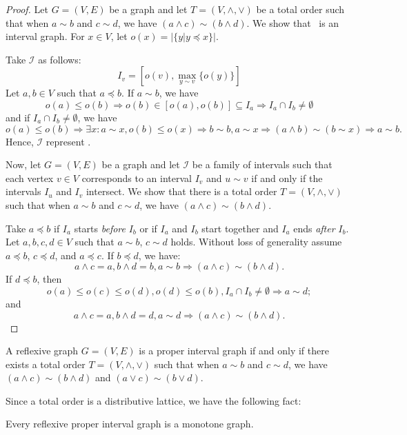 \begin{proof}
Let \(G=(V,E)\) be a graph and let \(T=(V,\wedge,\vee)\) be a total order such that
when \(a\sim b\) and \(c \sim d\), we have \((a \wedge c) \sim (b \wedge d)\)\@.
We show that \mG\ is an interval graph. For \(x\in V\), let \(o(x) = |\{y| y\preceq x\}|\)\@.

Take \(\mathcal{I}\) as follows:
\[I_v = [o(v), \max_{y\sim v}\{o(y)\}]\]
Let \(a, b\in V\) such that \(a \preceq b\)\@. If \(a\sim b\), we have
\[o(a) \le o(b) \Rightarrow o(b) \in [o(a), o(b)] \subseteq I_a \Rightarrow I_a \cap I_b \neq \emptyset\]
and if \(I_a \cap I_b \neq \emptyset\), we have
\[o(a) \le o(b) \Rightarrow \exists x: a \sim x, o(b) \le o(x) \Rightarrow b\sim b, a\sim x \Rightarrow (a \wedge b) \sim (b \sim x) \Rightarrow a \sim b.\]
Hence, \(\mathcal{I}\) represent \mG\@.

Now, let \(G=(V,E)\) be a graph and let \(\mathcal{I}\) be a family of intervals such that
each vertex \(v \in V\) corresponds to an interval \(I_v\) and \(u \sim v\)
if and only if the intervals \(I_u\) and \(I_v\) intersect. We show that there is a
total order \(T=(V,\wedge,\vee)\) such that
when \(a\sim b\) and \(c \sim d\), we have \((a \wedge c) \sim (b \wedge d)\)\@.

Take \(a\preceq b\) if \(I_a\) starts \emph{before} \(I_b\) or if \(I_a\) and \(I_b\)
start together and \(I_a\) ends \emph{after} \(I_b\)\@. 
Let \(a,b,c,d \in V\) such that \(a \sim b\), \(c \sim d\) holds.
Without loss of generality assume \(a \preceq b\), \(c \preceq d\), and \(a \preceq c\)\@. 
If \(b \preceq d\), we have:
\[a \wedge c = a, b \wedge d = b, a \sim b \Rightarrow  (a \wedge c) \sim (b \wedge d).\]
If \(d \preceq b\), then 
\[o(a) \le o(c) \le o(d), o(d) \le o(b), I_a \cap I_b \neq \emptyset \Rightarrow a\sim d;\]
and 
\[a \wedge c = a, b \wedge d = d, a\sim d \Rightarrow (a \wedge c) \sim (b \wedge d).\]

\end{proof}

\begin{theorem}\label{thm:minmax}
A reflexive graph \(G=(V,E)\) is a proper interval graph if and only if there exists
a total order \(T=(V,\wedge,\vee)\) such that
when \(a\sim b\) and \(c \sim d\), we have \((a \wedge c) \sim (b \wedge d)\) and \((a \vee c) \sim (b \vee d)\)\@.
\end{theorem}

Since a total order is a distributive lattice, we have the following fact:
\begin{cor} \label{cor:pintmon}
Every reflexive proper interval graph is a monotone graph.
\end{cor}

